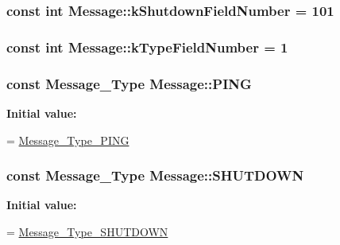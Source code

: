 \subsubsection[{\texorpdfstring{k\+Shutdown\+Field\+Number}{kShutdownFieldNumber}}]{\setlength{\rightskip}{0pt plus 5cm}const int Message\+::k\+Shutdown\+Field\+Number = 101\hspace{0.3cm}{\ttfamily [static]}}\hypertarget{class_message_abcfb3771be4f6daf22c28853761bcd33}{}\label{class_message_abcfb3771be4f6daf22c28853761bcd33}
\subsubsection[{\texorpdfstring{k\+Type\+Field\+Number}{kTypeFieldNumber}}]{\setlength{\rightskip}{0pt plus 5cm}const int Message\+::k\+Type\+Field\+Number = 1\hspace{0.3cm}{\ttfamily [static]}}\hypertarget{class_message_a7e929836116d1d4afdf1048ee821637a}{}\label{class_message_a7e929836116d1d4afdf1048ee821637a}
\subsubsection[{\texorpdfstring{P\+I\+NG}{PING}}]{\setlength{\rightskip}{0pt plus 5cm}const {\bf Message\+\_\+\+Type} Message\+::\+P\+I\+NG\hspace{0.3cm}{\ttfamily [static]}}\hypertarget{class_message_abc34006eaf98f78c4f90767fd89f7216}{}\label{class_message_abc34006eaf98f78c4f90767fd89f7216}
{\bfseries Initial value\+:}
\begin{DoxyCode}
=
    \hyperlink{message_8pb_8h_a1b620cd54f3d6b48f3c5f7979545b160a585150d90c2510e56b92aa0bd8d0d552}{Message\_Type\_PING}
\end{DoxyCode}
\subsubsection[{\texorpdfstring{S\+H\+U\+T\+D\+O\+WN}{SHUTDOWN}}]{\setlength{\rightskip}{0pt plus 5cm}const {\bf Message\+\_\+\+Type} Message\+::\+S\+H\+U\+T\+D\+O\+WN\hspace{0.3cm}{\ttfamily [static]}}\hypertarget{class_message_ad4dfaa2599a7afc20df9fd87b0f09fea}{}\label{class_message_ad4dfaa2599a7afc20df9fd87b0f09fea}
{\bfseries Initial value\+:}
\begin{DoxyCode}
=
    \hyperlink{message_8pb_8h_a1b620cd54f3d6b48f3c5f7979545b160a8e12d42a70a33d4cc5ef06acef830b77}{Message\_Type\_SHUTDOWN}
\end{DoxyCode}
